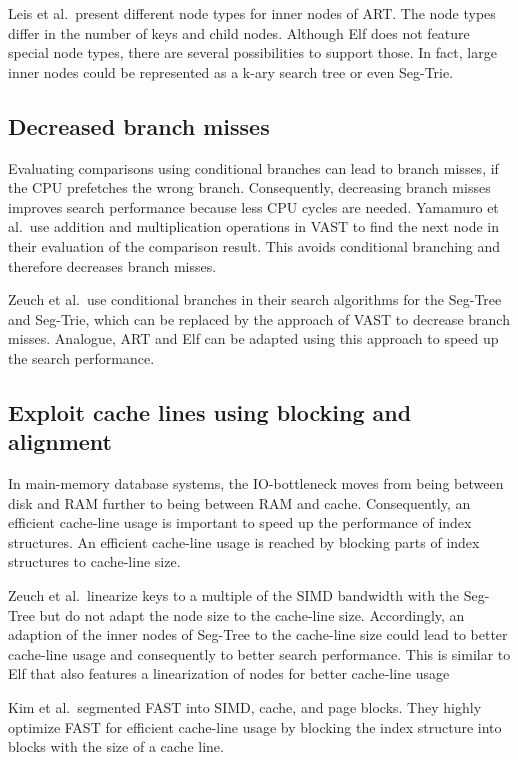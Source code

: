 \documentclass[runningheads,a4paper]{llncs}
\begin{document}
Leis et al.\ present different node types for inner nodes of ART. The node types differ in the number of keys and child nodes. Although Elf does not feature special node types, there are several possibilities to support those. In fact, large inner nodes could be represented as a k-ary search tree or even Seg-Trie.

\subsection{Decreased branch misses}
Evaluating comparisons using conditional branches can lead to branch misses, if the CPU prefetches the wrong branch. Consequently, decreasing branch misses improves search performance because less CPU cycles are needed. Yamamuro et al.\ use addition and multiplication operations in VAST to find the next node in their evaluation of the comparison result. This avoids conditional branching and therefore decreases branch misses.

Zeuch et al.\ use conditional branches in their search algorithms for the Seg-Tree and Seg-Trie, which can be replaced by the approach of VAST to decrease branch misses. Analogue, ART and Elf can be adapted using this approach to speed up the search performance.
\subsection{Exploit cache lines using blocking and alignment}
In main-memory database systems, the IO-bottleneck moves from being between disk and RAM further to being between RAM and cache. Consequently, an efficient cache-line usage is important to speed up the performance of index structures. An efficient cache-line usage is reached by blocking parts of index structures to cache-line size.

Zeuch et al.\ linearize keys to a multiple of the SIMD bandwidth with the Seg-Tree but do not adapt the node size to the cache-line size. Accordingly, an adaption of the inner nodes of Seg-Tree to the cache-line size could lead to better cache-line usage and consequently to better search performance. This is similar to Elf that also features a linearization of nodes for better cache-line usage

Kim et al.\ segmented FAST into SIMD, cache, and page blocks. They highly optimize FAST for efficient cache-line usage by blocking the index structure into blocks with the size of a cache line.
\end{document}

